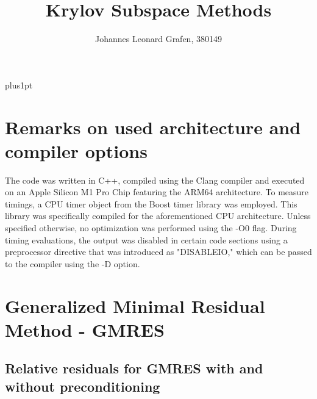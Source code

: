 \documentclass[11pt,a4paper]{article}
\title{Krylov Subspace Methods}
\author{Johannes Leonard Grafen, 380149}
\begin{document}
\renewcommand\baselinestretch{1.0}
\baselineskip=18pt plus1pt	

\maketitle
\newpage
{}
\tableofcontents
\listoffigures	%
\listoftables  %
\newpage

\section{Remarks on used architecture and compiler options}
The code was written in C++, compiled using the Clang compiler and executed on an Apple Silicon M1 Pro Chip featuring the ARM64 architecture. To measure timings, a CPU timer object from the Boost timer library was employed. This library was specifically compiled for the aforementioned CPU architecture. Unless specified otherwise, no optimization was performed using the -O0 flag. During timing evaluations, the output was disabled in certain code sections using a preprocessor directive that was introduced as "DISABLEIO," which can be passed to the compiler using the -D option.

\section{Generalized Minimal Residual Method - GMRES}
\label{chapter:GMRES}

\subsection{Relative residuals for GMRES with and without preconditioning}
\end{document}
